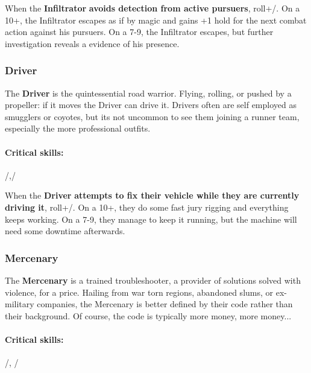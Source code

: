 \documentclass[oneside,10pt]{article}
\begin{document}
\begin{multicols}{2}
\begin{tcolorbox}[title=Special Move]
   When the \textbf{Infiltrator}
  \textbf{avoids detection from active pursuers}, roll+\twitch/. On a
  10+, the Infiltrator escapes as if by magic and gains +1
  hold for the next combat action against his pursuers. On a 7-9, the
  Infiltrator escapes, but further investigation reveals a evidence of
  his presence.
\end{tcolorbox}


\subsubsection{Driver}

The \textbf{Driver} is the quintessential road warrior. Flying,
rolling, or pushed by a propeller: if it moves the Driver can drive
it. Drivers often are self employed as smugglers or coyotes, but its
not uncommon to see them joining a runner team, especially the more
professional outfits.

\paragraph{Critical skills:}
\mastery/,\twitch/

\begin{tcolorbox}[title=Special Move]
   When the \textbf{Driver} \textbf{attempts
    to fix their vehicle while they are currently driving it},
  roll+\mastery/. On a 10+, they do some fast jury rigging and
  everything keeps working. On a 7-9, they manage to keep it running,
  but the machine will need some downtime afterwards.
\end{tcolorbox}

\subsubsection{Mercenary}

The \textbf{Mercenary} is a trained troubleshooter, a provider of
solutions solved with violence, for a price. Hailing from war torn
regions, abandoned slums, or ex-military companies, the Mercenary is
better defined by their code rather than their background. Of course,
the code is typically more money, more money...

\paragraph{Critical skills:}
\oomph/, \mastery/


\end{multicols}
\end{document}
